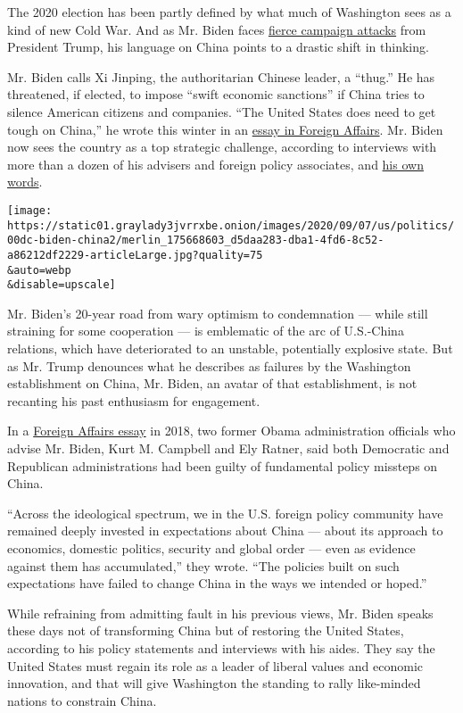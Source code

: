 The 2020 election has been partly defined by what much of Washington
sees as a kind of new Cold War. And as Mr. Biden faces
\href{https://www.nytimes3xbfgragh.onion/2020/05/15/us/politics/trump-ads-joe-biden.html}{fierce
campaign attacks} from President Trump, his language on China points to
a drastic shift in thinking.

Mr. Biden calls Xi Jinping, the authoritarian Chinese leader, a
``thug.'' He has threatened, if elected, to impose ``swift economic
sanctions'' if China tries to silence American citizens and companies.
``The United States does need to get tough on China,'' he wrote this
winter in an
\href{https://www.foreignaffairs.com/articles/united-states/2020-01-23/why-america-must-lead-again}{essay
in Foreign Affairs}. Mr. Biden now sees the country as a top strategic
challenge, according to interviews with more than a dozen of his
advisers and foreign policy associates, and
\href{https://www.washingtonpost.com/graphics/politics/policy-2020/foreign-policy/}{his
own words}.

\texttt{[image: https://static01.graylady3jvrrxbe.onion/images/2020/09/07/us/politics/00dc-biden-china2/merlin\_175668603\_d5daa283-dba1-4fd6-8c52-a86212df2229-articleLarge.jpg?quality=75\\\&auto=webp\\\&disable=upscale]}

Mr. Biden's 20-year road from wary optimism to condemnation --- while
still straining for some cooperation --- is emblematic of the arc of
U.S.-China relations, which have deteriorated to an unstable,
potentially explosive state. But as Mr. Trump denounces what he
describes as failures by the Washington establishment on China, Mr.
Biden, an avatar of that establishment, is not recanting his past
enthusiasm for engagement.

In a
\href{https://www.foreignaffairs.com/articles/china/2018-02-13/china-reckoning}{Foreign
Affairs essay} in 2018, two former Obama administration officials who
advise Mr. Biden, Kurt M. Campbell and Ely Ratner, said both Democratic
and Republican administrations had been guilty of fundamental policy
missteps on China.

``Across the ideological spectrum, we in the U.S. foreign policy
community have remained deeply invested in expectations about China ---
about its approach to economics, domestic politics, security and global
order --- even as evidence against them has accumulated,'' they wrote.
``The policies built on such expectations have failed to change China in
the ways we intended or hoped.''

While refraining from admitting fault in his previous views, Mr. Biden
speaks these days not of transforming China but of restoring the United
States, according to his policy statements and interviews with his
aides. They say the United States must regain its role as a leader of
liberal values and economic innovation, and that will give Washington
the standing to rally like-minded nations to constrain China.

